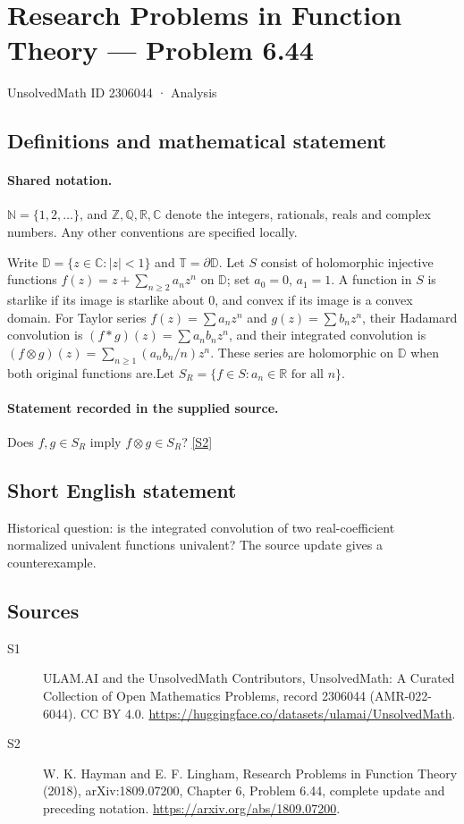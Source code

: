 \documentclass[11pt]{article}
\newcommand{\sref}[2]{\hyperlink{source:#1:#2}{[S#2]}}
\begin{document}
\setcounter{section}{2306043}
\section{Research Problems in Function Theory — Problem 6.44}\label{2306044}
{\small\sffamily UnsolvedMath ID 2306044 · Analysis}
\subsection{Definitions and mathematical statement}

\paragraph{Shared notation.}$\mathbb N=\{1,2,\ldots\}$, and $\mathbb Z,\mathbb Q,\mathbb R,\mathbb C$ denote the integers, rationals, reals and complex numbers. Any other conventions are specified locally.


Write $\mathbb D=\{z\in\mathbb C:|z|<1\}$ and $\mathbb T=\partial\mathbb D$. Let $S$ consist of holomorphic injective functions $f(z)=z+\sum_{n\ge2}a_nz^n$ on $\mathbb D$; set $a_0=0$, $a_1=1$. A function in $S$ is starlike if its image is starlike about $0$, and convex if its image is a convex domain. For Taylor series $f(z)=\sum a_nz^n$ and $g(z)=\sum b_nz^n$, their Hadamard convolution is $(f*g)(z)=\sum a_nb_nz^n$, and their integrated convolution is $(f\otimes g)(z)=\sum_{n\ge1}(a_nb_n/n)z^n$. These series are holomorphic on $\mathbb D$ when both original functions are.Let $S_R=\{f\in S:a_n\in\mathbb R\text{ for all }n\}$.
\paragraph{Statement recorded in the supplied source.}
Does $f,g\in S_R$ imply $f\otimes g\in S_R$? \sref{2306044}{2}
\subsection{Short English statement}
Historical question: is the integrated convolution of two real-coefficient normalized univalent functions univalent? The source update gives a counterexample.
\subsection{Sources}
\begin{description}
\item[\hypertarget{source:2306044:1}{S1}] ULAM.AI and the UnsolvedMath Contributors, UnsolvedMath: A Curated Collection of Open Mathematics Problems, record 2306044 (AMR-022-6044). CC BY 4.0. \url{https://huggingface.co/datasets/ulamai/UnsolvedMath}.
\item[\hypertarget{source:2306044:2}{S2}] W. K. Hayman and E. F. Lingham, Research Problems in Function Theory (2018), arXiv:1809.07200, Chapter 6, Problem 6.44, complete update and preceding notation. \url{https://arxiv.org/abs/1809.07200}.
\end{description}
\label{end:2306044}
\end{document}
